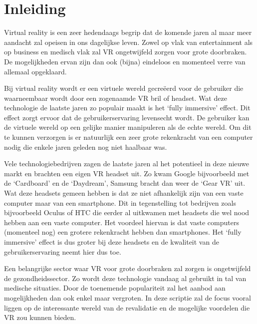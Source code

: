 
\chapter{Inleiding}
\label{ch:inleiding}

Virtual reality is een zeer hedendaags begrip dat de komende jaren al maar meer aandacht zal opeisen in ons dagelijkse leven. Zowel op vlak van entertainment als op business en medisch vlak zal VR ongetwijfeld zorgen voor grote doorbraken. De mogelijkheden ervan zijn dan ook (bijna) eindeloos en momenteel verre van allemaal opgeklaard.

Bij virtual reality wordt er een virtuele wereld gecreëerd voor de gebruiker die waarneembaar wordt door een zogenaamde VR bril of headset. Wat deze technologie de laatste jaren zo populair maakt is het ‘fully immersive’ effect. Dit effect zorgt ervoor dat de gebruikerservaring levensecht wordt. De gebruiker kan de virtuele wereld op een gelijke manier manipuleren als de echte wereld. Om dit te kunnen verzorgen is er natuurlijk een zeer grote rekenkracht van een computer nodig die enkele jaren geleden nog niet haalbaar was.

Vele technologiebedrijven zagen de laatste jaren al het potentieel in deze nieuwe markt en brachten  een eigen VR headset uit. Zo kwam Google bijvoorbeeld met de ‘Cardboard’ en de ‘Daydream’, Samsung bracht dan weer de ‘Gear VR’ uit. Wat deze headsets gemeen hebben is dat ze niet afhankelijk zijn van een vaste computer maar van een smartphone. Dit in tegenstelling tot bedrijven zoals bijvoorbeeld Oculus of HTC die eerder al uitkwamen met headsets die wel nood hebben aan een vaste computer. Het voordeel hiervan is dat vaste computers (momenteel nog) een grotere rekenkracht hebben dan smartphones. Het ‘fully immersive’ effect is dus groter bij deze headsets en de kwaliteit van de gebruikerservaring neemt hier dus toe. 

Een belangrijke sector waar VR voor grote doorbraken zal zorgen is ongetwijfeld de gezondheidssector. Zo wordt deze technologie vandaag al gebruikt in tal van medische situaties. Door de toenemende populariteit zal het aanbod aan mogelijkheden dan ook enkel maar vergroten. In deze scriptie zal de focus vooral liggen op de interessante wereld van de revalidatie en de mogelijke voordelen die VR zou kunnen bieden.


